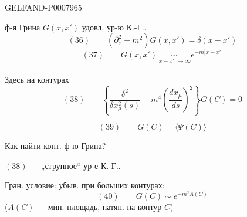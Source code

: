 \begin{GelfandAdjacentEvidence}{GELFAND-P000796}{5}

ф-я Грина \(G(x,x')\) удовл. ур-ю К.-Г..
\[
(36)\qquad (\partial_x^2-m^2)G(x,x')=\delta(x-x')
\]
\[
(37)\qquad G(x,x')\underset{|x-x'|\to\infty}{\sim}e^{-m|x-x'|}
\]

Здесь на контурах
\[
(38)\qquad \left\{\frac{\delta^2}{\delta x_\mu^2(s)}
-m^4\left(\frac{dx_\mu}{ds}\right)^2\right\}G(C)=0
\]
\end{GelfandAdjacentEvidence}

\[
(39)\qquad G(C)=\langle\Psi(C)\rangle
\]

Как найти конт. ф-ю Грина?

 \((38)\) --- „струнное“ ур-е К.-Г..

Гран. условие: убыв. при больших контурах:
\[
(40)\qquad G(C)\sim e^{-m^2 A(C)}
\]
(\(A(C)\) --- мин. площадь, натян. на контур \(C\))



